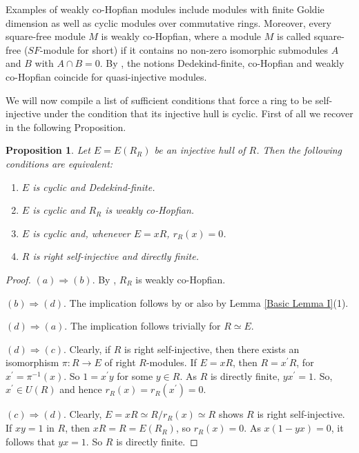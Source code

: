 \documentclass{amsart}
\theoremstyle{plain}
\newtheorem{proposition}[theorem]{Proposition}
\numberwithin{equation}{section}
\begin{document}
Examples
of weakly co-Hopfian modules include modules with finite Goldie dimension as well as cyclic modules over commutative rings. Moreover, every square-free
module $M$ is weakly co-Hopfian, where a module $M$ is called  {square-free} \textrm{(}$S F$-module for short\textrm{)} if it contains no non-zero isomorphic submodules $A$ and $B$ with $A \cap B =0$. By \cite[Proposition 1.4]{HV},
the notions Dedekind-finite, co-Hopfian and weakly co-Hopfian coincide for quasi-injective modules. 

We will now compile a list of
sufficient conditions that force a ring to be self-injective under the condition that its injective hull is cyclic. First of all we recover \cite[Propositions 2.4 and 2.9]{IY 5}
in the following Proposition. 


\begin{proposition}
\label{If E(R) is cyclic and R is weakly co-Hopf, then R is injective}
\label{If E(R) is cyclic and quasi Dedekind-finite, then R is co-Hopfian}
\label{E(R) cyclic implies Injective IV} \label{E(R) cyclic implies Injective III}
\label{If E(R) is cyclic and Dedekind-finite, then R is injective}
Let $E =E (R_{R})$ be an injective hull of $R$. Then the following conditions are equivalent: 


\begin{enumerate}
\item [(a)] $E$ is cyclic and Dedekind-finite. 

\item [(b)] $E$ is cyclic and $R_{R}$ is weakly co-Hopfian. 

\item [(c)] $E$ is cyclic and, whenever $E =x R$, $r_{R} (x) =0$. 

\item [(d)] $R$ is right self-injective and directly finite. \end{enumerate}
\end{proposition}


\begin{proof}
$(a) \Rightarrow (b)$. By \cite[Corollary 1.5]{HV}, $R_{R}$ is weakly co-Hopfian.

$(b) \Rightarrow (d)$. The implication follows by \cite[Proposition 2.4]{IY 5} or also by Lemma \ref{Basic Lemma I}(1).

$(d) \Rightarrow (a)$. The implication follows trivially for $R \simeq E$.

$(d) \Rightarrow (c)$. Clearly, if $R$ is right self-injective, then there exists an isomorphism $\pi  :R \rightarrow E$ of right $R$-modules. If $E =x R$, then $R =x^{ \prime } R$, for $x^{ \prime} = \pi^{ -1} (x)$. So $1 =x^{ \prime } y$ for some $y \in R$. As $R$ is directly finite, $y x^{ \prime } =1$. So, $x^{ \prime } \in U (R)$ and hence $r_{R} (x) =r_{R} (x^{ \prime }) =0$. 

$(c) \Rightarrow (d)$. Clearly, $E =x R \simeq R/r_{R} (x) \simeq R$ shows $R$ is right self-injective. If $x y =1$ in $R$, then $x R =R =E (R_{R})$, so $r_{R} (x) =0$. As $x (1 -y x) =0$, it follows that $y x =1$. So $R$ is directly finite. 
\end{proof}
\end{document}
